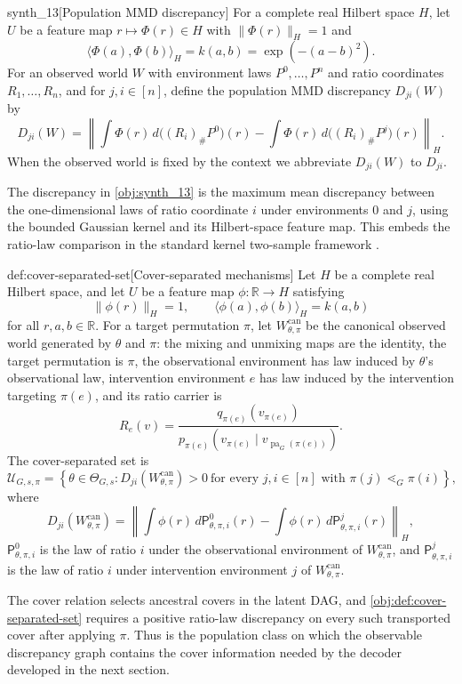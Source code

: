 \begin{definitionv}{synth_13}[Population MMD discrepancy]
For a complete real Hilbert space \(H\), let \(U\) be a feature map \(r\mapsto \Phi(r)\in H\) with \(\|\Phi(r)\|_H=1\) and
\[
\langle \Phi(a),\Phi(b)\rangle_H=k(a,b)=\exp(-(a-b)^2).
\]
For an observed world \(W\) with environment laws \(P^0,\ldots,P^n\) and ratio coordinates \(R_1,\ldots,R_n\), and for \(j,i\in[n]\), define the population MMD discrepancy \(D_{ji}(W)\) by
\[
D_{ji}(W)
=
\left\|
\int \Phi(r)\,d\bigl((R_i)_\# P^0\bigr)(r)
-
\int \Phi(r)\,d\bigl((R_i)_\# P^j\bigr)(r)
\right\|_H .
\]
When the observed world is fixed by the context we abbreviate \(D_{ji}(W)\) to \(D_{ji}\).
\end{definitionv}

The discrepancy  in \cref{obj:synth_13} is the maximum mean discrepancy between the one-dimensional laws of ratio coordinate \(i\) under environments \(0\) and \(j\), using the bounded Gaussian kernel and its Hilbert-space feature map. This embeds the ratio-law comparison in the standard kernel two-sample framework \citep{GrettonEtAl2012KernelTwoSample,Sriperumbudur2010,Sriperumbudur2011}.

\begin{definitionv}{def:cover-separated-set}[Cover-separated mechanisms]
Let \(H\) be a complete real Hilbert space, and let \(U\) be a feature map \(\phi:\mathbb R\to H\) satisfying
\[
\|\phi(r)\|_H=1,
\qquad
\langle \phi(a),\phi(b)\rangle_H=k(a,b)
\]
for all \(r,a,b\in\mathbb R\).  For a target permutation \(\pi\), let \(W_{\theta,\pi}^{\mathrm{can}}\) be the canonical observed world generated by \(\theta\) and \(\pi\): the mixing and unmixing maps are the identity, the target permutation is \(\pi\), the observational environment has law induced by \(\theta\)'s observational law, intervention environment \(e\) has law induced by the intervention targeting \(\pi(e)\), and its ratio carrier is
\[
R_e(v)=
\frac{q_{\pi(e)}(v_{\pi(e)})}
{p_{\pi(e)}(v_{\pi(e)}\mid v_{\operatorname{pa}_G(\pi(e))})}.
\]
The cover-separated set is
\[
\mathcal U_{G,s,\pi}
=
\left\{
\theta\in\Theta_{G,s}:
D_{ji}\!\left(W_{\theta,\pi}^{\mathrm{can}}\right)>0
\ \text{for every } j,i\in[n]\text{ with }\pi(j)\lessdot_G\pi(i)
\right\},
\]
where
\[
D_{ji}\!\left(W_{\theta,\pi}^{\mathrm{can}}\right)
=
\left\|
\int \phi(r)\,d\mathsf P^0_{\theta,\pi,i}(r)
-
\int \phi(r)\,d\mathsf P^j_{\theta,\pi,i}(r)
\right\|_H,
\]
\(\mathsf P^0_{\theta,\pi,i}\) is the law of ratio \(i\) under the observational environment of \(W_{\theta,\pi}^{\mathrm{can}}\), and \(\mathsf P^j_{\theta,\pi,i}\) is the law of ratio \(i\) under intervention environment \(j\) of \(W_{\theta,\pi}^{\mathrm{can}}\).
\end{definitionv}

The cover relation  selects ancestral covers in the latent DAG, and \cref{obj:def:cover-separated-set} requires a positive ratio-law discrepancy on every such transported cover after applying \(\pi\). Thus  is the population class on which the observable discrepancy graph contains the cover information needed by the decoder developed in the next section.
